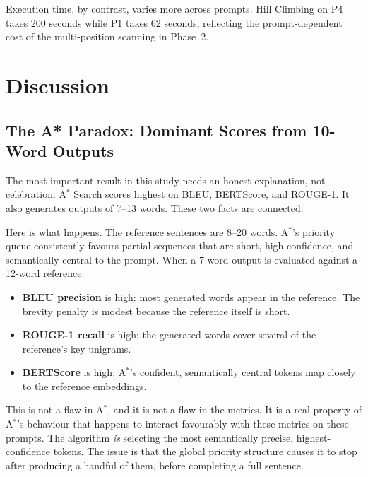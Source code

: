 \documentclass[12pt]{article}
\begin{document}
	Execution time, by contrast, varies more across prompts. Hill Climbing on P4 takes 200 seconds while P1 takes 62 seconds, reflecting the prompt-dependent cost of the multi-position scanning in Phase~2.
	
	\section{Discussion}
	\label{sec:discussion}
	
	\subsection{The A* Paradox: Dominant Scores from 10-Word Outputs}
	\label{sec:astar_paradox}
	
	The most important result in this study needs an honest explanation, not celebration. A$^*$ Search scores highest on BLEU, BERTScore, and ROUGE-1. It also generates outputs of 7--13 words. These two facts are connected.
	
	Here is what happens. The reference sentences are 8--20 words. A$^*$'s priority queue consistently favours partial sequences that are short, high-confidence, and semantically central to the prompt. When a 7-word output is evaluated against a 12-word reference:
	
	\begin{itemize}[leftmargin=*]
		\item \textbf{BLEU precision} is high: most generated words appear in the reference. The brevity penalty is modest because the reference itself is short.
		\item \textbf{ROUGE-1 recall} is high: the generated words cover several of the reference's key unigrams.
		\item \textbf{BERTScore} is high: A$^*$'s confident, semantically central tokens map closely to the reference embeddings.
	\end{itemize}
	
	This is not a flaw in A$^*$, and it is not a flaw in the metrics. It is a real property of A$^*$'s behaviour that happens to interact favourably with these metrics on these prompts. The algorithm \emph{is} selecting the most semantically precise, highest-confidence tokens. The issue is that the global priority structure causes it to stop after producing a handful of them, before completing a full sentence.
	
\end{document}
